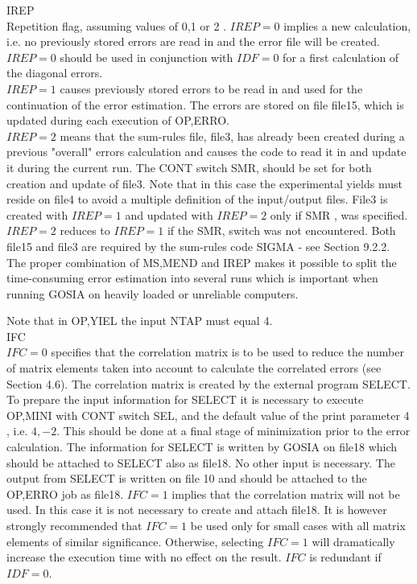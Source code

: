 \documentclass[10pt]{article}
\begin{document}
IREP\\
Repetition flag, assuming values of 0,1 or 2 . $I R E P=0$ implies a new calculation, i.e. no previously stored errors are read in and the error file will be created.\\
$I R E P=0$ should be used in conjunction with $I D F=0$ for a first calculation of the diagonal errors.\\
$I R E P=1$ causes previously stored errors to be read in and used for the continuation of the error estimation. The errors are stored on file file15, which is updated during each execution of OP,ERRO.\\
$I R E P=2$ means that the sum-rules file, file3, has already been created during a previous "overall" errors calculation and causes the code to read it in and update it during the current run. The CONT switch SMR, should be set for both creation and update of file3. Note that in this case the experimental yields must reside on file4 to avoid a multiple definition of the input/output files. File3 is created with $I R E P=1$ and updated with $I R E P=2$ only if SMR , was specified. $I R E P=2$ reduces to $I R E P=1$ if the SMR, switch was not encountered. Both file15 and file3 are required by the sum-rules code SIGMA - see Section 9.2.2. The proper combination of MS,MEND and IREP makes it possible to split the time-consuming error estimation into several runs which is important when running GOSIA on heavily loaded or unreliable computers.

Note that in OP,YIEL the input NTAP must equal 4.\\
IFC\\
$I F C=0$ specifies that the correlation matrix is to be used to reduce the number of matrix elements taken into account to calculate the correlated errors (see Section 4.6). The correlation matrix is created by the external program SELECT. To prepare the input information for SELECT it is necessary to execute OP,MINI with CONT switch SEL, and the default value of the print parameter 4 , i.e. $4,-2$. This should be done at a final stage of minimization prior to the error calculation. The information for SELECT is written by GOSIA on file18 which should be attached to SELECT also as file18. No other input is necessary. The output from SELECT is written on file 10 and should be attached to the OP,ERRO job as file18. $I F C=1$ implies that the correlation matrix will not be used. In this case it is not necessary to create and attach file18. It is however strongly recommended that $I F C=1$ be used only for small cases with all matrix elements of similar significance. Otherwise, selecting $I F C=1$ will dramatically increase the execution time with no effect on the result. $I F C$ is redundant if $I D F=0$.
\end{document}
